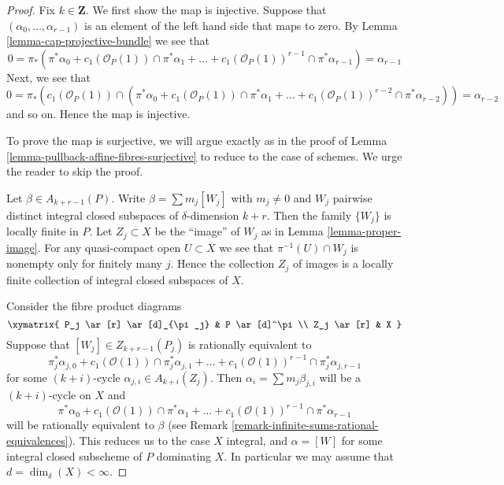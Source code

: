 \begin{proof}
Fix $k \in \mathbf{Z}$. We first show the map is injective.
Suppose that $(\alpha_0, \ldots, \alpha_{r - 1})$ is an element
of the left hand side that maps to zero.
By Lemma \ref{lemma-cap-projective-bundle} we see that
$$
0 = \pi_*(\pi^*\alpha_0 +
c_1(\mathcal{O}_P(1)) \cap \pi^*\alpha_1
+ \ldots +
c_1(\mathcal{O}_P(1))^{r - 1} \cap \pi^*\alpha_{r-1})
= \alpha_{r - 1}
$$
Next, we see that
$$
0 = \pi_*(c_1(\mathcal{O}_P(1)) \cap (\pi^*\alpha_0 +
c_1(\mathcal{O}_P(1)) \cap \pi^*\alpha_1
+ \ldots +
c_1(\mathcal{O}_P(1))^{r - 2} \cap \pi^*\alpha_{r - 2}))
= \alpha_{r - 2}
$$
and so on. Hence the map is injective.

\medskip\noindent
To prove the map is surjective, we will argue exactly
as in the proof of Lemma \ref{lemma-pullback-affine-fibres-surjective}
to reduce to the case of schemes.
We urge the reader to skip the proof.

\medskip\noindent
Let $\beta \in A_{k + r - 1}(P)$. Write $\beta = \sum m_j[W_j]$ with
$m_j \not = 0$ and $W_j$ pairwise distinct integral closed subspaces of
$\delta$-dimension $k + r$. Then the family $\{W_j\}$
is locally finite in $P$. Let $Z_j \subset X$ be the ``image''
of $W_j$ as in Lemma \ref{lemma-proper-image}. For any quasi-compact open
$U \subset X$ we see that $\pi^{-1}(U) \cap W_j$
is nonempty only for finitely many $j$. Hence the
collection $Z_j$ of images is a locally finite collection
of integral closed subspaces of $X$.

\medskip\noindent
Consider the fibre product diagrams
$$
\xymatrix{
P_j \ar[r] \ar[d]_{\pi_j} & P \ar[d]^\pi \\
Z_j \ar[r] & X
}
$$
Suppose that $[W_j] \in Z_{k + r - 1}(P_j)$
is rationally equivalent to
$$
\pi_j^*\alpha_{j, 0} +
c_1(\mathcal{O}(1)) \cap \pi_j^*\alpha_{j, 1} +
\ldots +
c_1(\mathcal{O}(1))^{r - 1} \cap \pi_j^*\alpha_{j, r - 1}
$$
for some $(k + i)$-cycle $\alpha_{j, i} \in A_{k + i}(Z_j)$. Then
$\alpha_i = \sum m_j \beta_{j, i}$ will be a $(k + i)$-cycle on $X$
and
$$
\pi^*\alpha_0 +
c_1(\mathcal{O}(1)) \cap \pi^*\alpha_1 +
\ldots +
c_1(\mathcal{O}(1))^{r - 1} \cap \pi^*\alpha_{r - 1}
$$
will be rationally equivalent to $\beta$ (see
Remark \ref{remark-infinite-sums-rational-equivalences}).
This reduces us to the case $X$ integral, and
$\alpha = [W]$ for some integral closed subscheme
of $P$ dominating $X$. In particular we may
assume that $d = \dim_\delta(X) < \infty$.


\end{proof}
